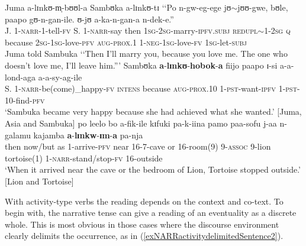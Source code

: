 \begin{exe}
\ex\label{exNARRhoboka}
\gll Juma a-lɪnkʊ-m̩-bʊʊl-a Sambʊka a-lɪnkʊ-tɪ \lq\lq Po n-gw-eg-ege jʊ$\sim$jʊʊ-gwe, bʊle, paapo gʊ-n-gan-ile. ʊ-jʊ a-ka-n-gan-a n-dek-e.''\\
J. 1-\textsc{narr}-1-tell-\textsc{fv} S. 1-\textsc{narr}-say then \textsc{1sg}-\textsc{2sg}-marry-\textsc{ipfv.subj} \textsc{redupl}$\sim$1-\textsc{2sg} \textsc{q} because \textsc{2sg}-\textsc{1sg}-love-\textsc{pfv} \textsc{aug}-\textsc{prox.1} 1-\textsc{neg}-\textsc{1sg}-love-\textsc{fv} \textsc{1sg}-let-\textsc{subj}\\
\glt Juma told Sambuka \lq\lq Then I'll marry you, because you love me. The one who doesn't love me, I'll leave him.''{}'
\sn \gll Sambʊka \textbf{a}-\textbf{lɪnkʊ}-\textbf{hobok}-\textbf{a} fiijo paapo ɪ-si a-a-lond-aga a-a-sy-ag-ile\\
 S. 1-\textsc{narr}-be(come)\_happy-\textsc{fv} \textsc{intens} because \textsc{aug}-\textsc{prox.10} 1-\textsc{pst}-want-\textsc{ipfv} 1-\textsc{pst}-10-find-\textsc{pfv}\\
\glt \lq  Sambuka became very happy because she had achieved what she wanted.' [Juma, Asia and Sambuka]
\ex \label{exNARRIma} \gll po leelo bo a-fik-ile kɪfuki pa-k-iina pamo paa-sofu j-aa n-galamu kajamba \textbf{a}-\textbf{lɪnkw}-\textbf{ɪm}-\textbf{a} pa-nja\\
then now/but as 1-arrive-\textsc{pfv} near 16-7-cave or 16-room(9) 9-\textsc{assoc} 9-lion tortoise(1) 1-\textsc{narr}-stand/stop-\textsc{fv} 16-outside\\
\glt \lq When it arrived near the cave or the bedroom of Lion, Tortoise stopped outside.' [Lion and Tortoise]
\end{exe}

With activity-type verbs the reading depends on the context and co-text. To begin with, the narrative tense can give a reading of an eventuality as a discrete whole. This is most obvious in those cases where the discourse environment clearly delimits the occurrence, as in (\ref{exNARRactivitydelimitedSentence2}).

